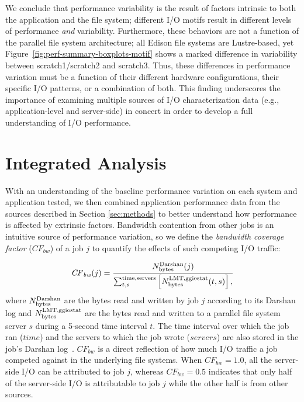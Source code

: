 We conclude that performance variability is the result of factors intrinsic to both the application and the file system;
different I/O motifs result in different levels of performance \emph{and} variability.
Furthermore, these behaviors are not a function of the parallel file system architecture; all Edison file systems are Lustre-based, yet Figure~\ref{fig:perf-summary-boxplots-motif} shows a marked difference in variability between scratch1/scratch2 and scratch3.
Thus, these differences in performance variation must be a function of their different hardware configurations, their specific I/O patterns, or a combination of both.
This finding underscores the importance of examining multiple sources of I/O characterization data (e.g., application-level and server-side) in concert in order to develop a full understanding of I/O performance.

\section{Integrated Analysis} \label{sec:results/umami}

With an understanding of the baseline performance variation on each system and application tested, we then combined application performance data from the sources described in Section \ref{sec:methods} to better understand how performance is affected by extrinsic factors.
Bandwidth contention from other jobs is an intuitive source of performance variation, so we define the \emph{bandwidth coverage factor} ($\mathit{CF}_{\mathit{bw}}$) of a job $j$ to quantify the effects of such competing I/O traffic:

\begin{equation} \label{eq:cf}
    \mathit{CF}_{\mathit{bw}}(j) = \frac{N_{\textup{bytes}}^{\textup{Darshan}}(j)}
    {\sum_{t,s}^{\textup{time,servers}}
    \left [ N_{\textup{bytes}}^{\textup{LMT,ggiostat}}(t,s) \right ] , }
\end{equation}
%
where 
$N_{\textup{bytes}}^{\textup{Darshan}}$ are the bytes read and written by job $j$ according to its Darshan log and 
$N_{\textup{bytes}}^{\textup{LMT,ggiostat}}$ are the bytes read and written to a parallel file system server $s$ during a 5-second time interval $t$.
The time interval over which the job ran ($\mathit{time}$) and the servers to which the job wrote ($\mathit{servers}$) are also stored in the job's Darshan log~\cite{snyder2016modular}.
$\mathit{CF}_{\mathit{bw}}$ is a direct reflection of how much I/O traffic a job competed against in the underlying file systems.
When $\mathit{CF}_{\mathit{bw}} = 1.0$, all the server-side I/O can be attributed to job $j$, whereas $\mathit{CF}_{\mathit{bw}} = 0.5$ indicates that only half of the server-side I/O is attributable to job $j$ while the other half is from other sources.

